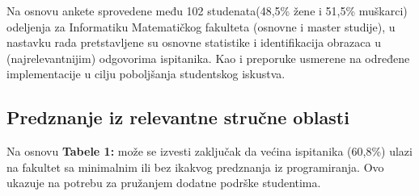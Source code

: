 \documentclass[a4paper]{article}
\begin{document}
Na osnovu ankete sprovedene među 102 studenata(48,5\% žene i 51,5\% muškarci) odeljenja za Informatiku Matematičkog fakulteta (osnovne i master studije), u nastavku rada pretstavljene su osnovne statistike i identifikacija obrazaca u (najrelevantnijim) odgovorima ispitanika. Kao i preporuke usmerene na određene implementacije u cilju poboljšanja studentskog iskustva. \\









\subsection{\textbf{Predznanje iz relevantne stručne oblasti} }
\label{subsec:podnaslov2}

Na osnovu \textbf{Tabele 1:} može se izvesti zaključak da većina ispitanika (60,8\%) ulazi na fakultet sa minimalnim ili bez ikakvog predznanja iz programiranja. Ovo ukazuje na potrebu za pružanjem dodatne podrške studentima.\\
\end{document}
